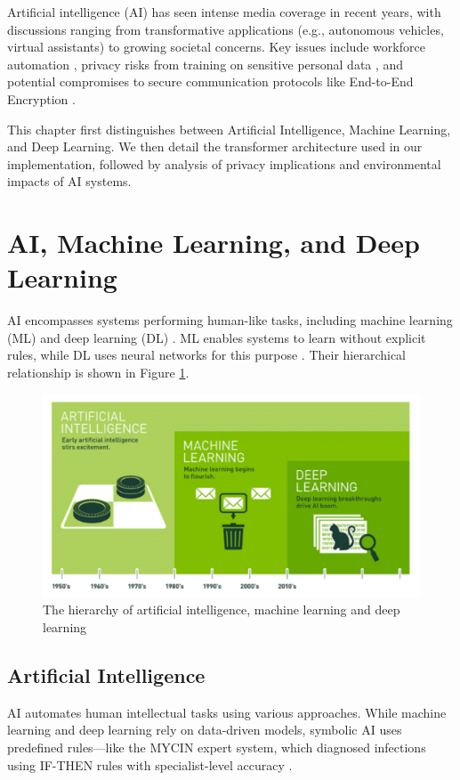 \documentclass[licencjacka,en]{pracamgr}
\begin{document}
Artificial intelligence (AI) has seen intense media coverage in recent years, with discussions ranging from transformative applications (e.g., autonomous vehicles, virtual assistants) to growing societal concerns. Key issues include workforce automation \cite{francuz_1}, privacy risks from training on sensitive personal data \cite{ibm_privacy}, and potential compromises to secure communication protocols like End-to-End Encryption \cite{E2EE}.

This chapter first distinguishes between Artificial Intelligence, Machine Learning, and Deep Learning. We then detail the transformer architecture used in our implementation, followed by analysis of privacy implications and environmental impacts of AI systems.


\section{AI, Machine Learning, and Deep Learning}
AI encompasses systems performing human-like tasks, including machine learning (ML) and deep learning (DL) \cite{ibm_ai,francuz_2}. ML enables systems to learn without explicit rules, while DL uses neural networks for this purpose \cite{ibm_ai}. Their hierarchical relationship is shown in Figure \ref{fig:hierarchy-ai-ml-dl}.

\begin{figure}
    \centering
    \includegraphics[width=0.5\linewidth]{bachelor_images/nvidia_ai_hierarchy.png}
    \caption{The hierarchy of artificial intelligence, machine learning and deep learning \cite{nvidiaimage}}
    \label{fig:hierarchy-ai-ml-dl}
\end{figure}

\subsection{Artificial Intelligence}
AI automates human intellectual tasks using various approaches. While machine learning and deep learning rely on data-driven models, symbolic AI uses predefined rules—like the MYCIN expert system, which diagnosed infections using IF-THEN rules with specialist-level accuracy \cite{francuz_2, mycin}.
\end{document}
